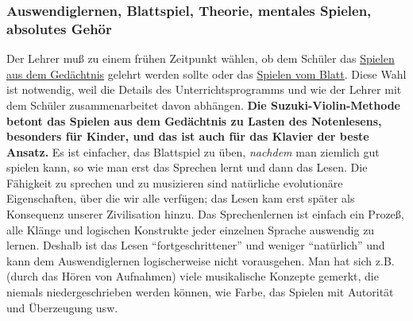 \subsubsection{Auswendiglernen, Blattspiel, Theorie, mentales Spielen, absolutes Gehör}
\label{c1iii16c}

Der Lehrer muß zu einem frühen Zeitpunkt wählen, ob dem Schüler das \hyperref[c1iii6]{Spielen aus dem Gedächtnis} gelehrt werden sollte oder das \hyperref[c1iii11]{Spielen vom Blatt}.
Diese Wahl ist notwendig, weil die Details des Unterrichtsprogramms und wie der Lehrer mit dem Schüler zusammenarbeitet davon abhängen.
\textbf{Die Suzuki-Violin-Methode betont das Spielen aus dem Gedächtnis zu Lasten des Notenlesens, besonders für Kinder, und das ist auch für das Klavier der beste Ansatz.}
Es ist einfacher, das Blattspiel zu üben, \textit{nachdem} man ziemlich gut spielen kann,
so wie man erst das Sprechen lernt und dann das Lesen.
Die Fähigkeit zu sprechen und zu musizieren sind natürliche evolutionäre Eigenschaften, über die wir alle verfügen; das Lesen kam erst später als Konsequenz unserer Zivilisation hinzu.
Das Sprechenlernen ist einfach ein Prozeß, alle Klänge und logischen Konstrukte jeder einzelnen Sprache auswendig zu lernen.
Deshalb ist das Lesen \enquote{fortgeschrittener} und weniger \enquote{natürlich} und kann dem Auswendiglernen logischerweise nicht vorausgehen.
Man hat sich z.B. (durch das Hören von Aufnahmen) viele musikalische Konzepte gemerkt, die niemals niedergeschrieben werden können, wie Farbe, das Spielen mit Autorität und Überzeugung usw.

